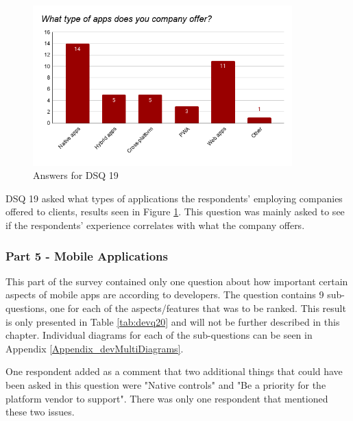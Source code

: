 \documentclass[a4paper,12pt]{article}
\renewcommand{\arraystretch}{1.5}
\begin{document}
\begin{figure}[ht!]
    \centering
    \includegraphics[width=10cm]{img/Results/dsq19.png}
    \caption{Answers for DSQ 19}
    \label{fig:res_devq19}
\end{figure}

DSQ 19 asked what types of applications the respondents' employing companies offered to clients, results seen in Figure \ref{fig:res_devq19}. This question was mainly asked to see if the respondents' experience correlates with what the company offers.

\subsubsection{Part 5 - Mobile Applications}
\label{Results_dev_part5}
This part of the survey contained only one question about how important certain aspects of mobile apps are according to developers. The question contains 9 sub-questions, one for each of the aspects/features that was to be ranked. This result is only presented in Table \ref{tab:devq20} and will not be further described in this chapter. Individual diagrams for each of the sub-questions can be seen in Appendix \ref{Appendix_devMultiDiagrams}.

One respondent added as a comment that two additional things that could have been asked in this question were "Native controls" and "Be a priority for the platform vendor to support". There was only one respondent that mentioned these two issues.

\setlength{\parindent}{0pt}
\setlength{\arrayrulewidth}{0.4mm}
\setlength{\tabcolsep}{4pt}
\renewcommand{\arraystretch}{1.5}
\end{document}
